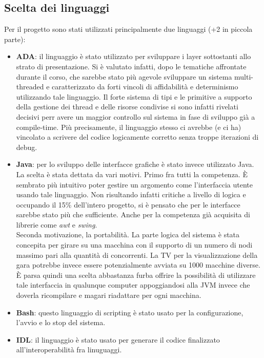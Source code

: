 \subsection{Scelta dei linguaggi}
Per il progetto sono stati utilizzati principalmente due linguaggi (+2 in piccola parte):
\begin{itemize}
\item \textbf{ADA}: il linguaggio \`{e} stato utilizzato per sviluppare i layer sottostanti allo strato di presentazione. Si \`{e} valutato infatti,
dopo le tematiche affrontate durante il corso, che sarebbe stato pi\`{u} agevole sviluppare un sistema multi-threaded e caratterizzato
da forti vincoli di affidabilit\`{a} e determinismo utilizzando tale linguaggio. Il forte sistema di tipi e le primitive a supporto della gestione
dei thread e delle risorse condivise si sono infatti rivelati decisivi perr avere un maggior controllo sul sistema in fase di sviluppo gi\`{a} 
a compile-time. Pi\`{u} precisamente, il linguaggio stesso ci avrebbe (e ci ha) vincolato a scrivere del codice logicamente corretto senza
troppe iterazioni di debug.
\item \textbf{Java}: per lo sviluppo delle interfacce grafiche \`{e} stato invece utilizzato Java. La scelta \`{e} stata dettata da vari motivi.
Primo fra tutti la competenza. \`{E} sembrato pi\`{u} intuitivo poter gestire un argomento come l'interfaccia utente usando tale linguaggio.
Non risultando infatti critiche a livello di logica e occupando il 15\% dell'intero progetto, si \`{e} pensato che per le interfacce sarebbe
stato pi\`{u} che sufficiente. Anche per la competenza gi\`{a} acquisita di librerie come \emph{awt} e \emph{swing}.\\
Seconda motivazione, la portabilit\`{a}. La parte logica del sistema \`{e} stata concepita per girare su una macchina con il supporto di un numero di
nodi massimo pari alla quantit\`{a} di concorrenti. La TV per la visualizzazione della gara potrebbe invece essere potenzialmente avviata
su 1000 macchine diverse. \`{E} parsa quindi una scelta abbastanza furba offrire la possibilit\`{a} di utilizzare tale interfaccia in qualunque
computer appoggiandosi alla JVM invece che doverla ricompilare e magari riadattare per ogni macchina.
\item \textbf{Bash}: questo linguaggio di scripting \`{e} stato usato per la configurazione, l'avvio e lo stop del sistema.
\item \textbf{IDL}: il linguaggio è stato usato per generare il codice finalizzato all'interoperabilità fra linuguaggi.
\end{itemize}
